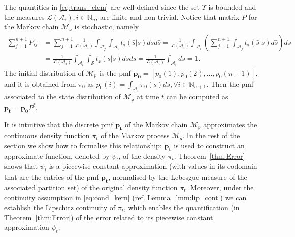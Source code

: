 \documentclass{LMCS}
\begin{document}
The quantities in \eqref{eq:trans_elem} are well-defined since the set $\Upsilon$ is bounded and the measures $\mathcal L(\mathcal A_i), i\in \mathbb N_n$, 
are finite and non-trivial. 
Notice that matrix $P$ for the Markov chain $\mathscr M_{\mathfrak p}$ is stochastic, namely
\begin{align*}
\sum_{j=1}^{n+1} P_{ij}
& = \sum_{j=1}^{n+1}\frac{1}{\mathcal L(\mathcal A_i)}\int_{\mathcal A_j}\int_{\mathcal A_i}t_{\mathfrak s}(\bar s|s)ds d\bar s
= \frac{1}{\mathcal L(\mathcal A_i)}\int_{\mathcal A_i}\left(\sum_{j=1}^{n+1}\int_{\mathcal A_j}t_{\mathfrak s}(\bar s|s)d\bar s\right)ds\\
& = \frac{1}{\mathcal L(\mathcal A_i)}\int_{\mathcal A_i}\int_{\mathcal S}t_{\mathfrak s}(\bar s|s)d\bar s ds
= \frac{1}{\mathcal L(\mathcal A_i)}\int_{\mathcal A_i}ds
= 1.
\end{align*}
The initial distribution of $\mathscr M_{\mathfrak p}$ is the pmf $\mathbf{p_0} = [p_0(1),p_0(2),\ldots,p_0(n+1)]$, 
and it is obtained from $\pi_0$ as
$p_0(i) = \int_{\mathcal A_i}\pi_0(s)ds, \forall i\in\mathbb N_{n+1}$.
Then the pmf associated to the state distribution of $\mathscr M_{\mathfrak p}$ at time $t$ can be computed as $\mathbf{p_t} = \mathbf{p_0} P^t$.

It is intuitive that the discrete pmf $\mathbf{p_t}$ of the Markov chain $\mathscr M_{\mathfrak p}$ approximates the continuous density function $\pi_t$ of the Markov process $\mathscr M_{\mathfrak s}$. 
In the rest of the section we show how to formalise this relationship: 
$\mathbf{p_t}$ is used to construct an approximate function, denoted by $\psi_t$, 
of the density $\pi_t$. 
Theorem~\ref{thm:Error} shows that $\psi_t$ is a piecewise constant approximation 
(with values in its codomain that are the entries of the pmf $\mathbf{p_t}$, normalised by the Lebesgue measure of the associated partition set) 
of the original density function $\pi_t$. 
Moreover, 
under the continuity assumption in \eqref{eq:cond_kern} (ref. Lemma~\ref{lmm:lip_cont}) we can establish the Lipschitz continuity of $\pi_t$, 
which enables the quantification (in Theorem~\ref{thm:Error}) of the error related to its piecewise constant approximation $\psi_t$.    
\end{document}
